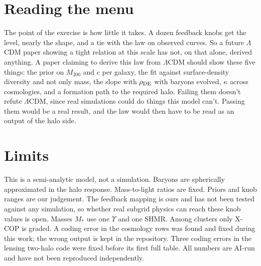 \documentclass[11pt]{article}
\begin{document}
\section{Reading the menu}
The point of the exercise is how little it takes. A dozen feedback knobs get the level, nearly the shape, and a tie with the law on observed curves. So a future $\Lambda$CDM paper showing a tight relation at this scale has not, on that alone, derived anything. A paper claiming to derive this law from $\Lambda$CDM should show these five things: the prior on $M_{200}$ and $c$ per galaxy, the fit against surface-density diversity and not only mass, the slope with $\rho_{\rm DE}$ with baryons evolved, $\kappa$ across cosmologies, and a formation path to the required halo. Failing them doesn't refute $\Lambda$CDM, since real simulations could do things this model can't. Passing them would be a real result, and the law would then have to be read as an output of the halo side.

\section{Limits}
This is a semi-analytic model, not a simulation. Baryons are spherically approximated in the halo response. Mass-to-light ratios are fixed. Priors and knob ranges are our judgement. The feedback mapping is ours and has not been tested against any simulation, so whether real subgrid physics can reach these knob values is open. Masses $M_*$ use one $\Upsilon$ and one SHMR. Among clusters only X-COP is graded. A coding error in the cosmology rows was found and fixed during this work; the wrong output is kept in the repository. Three coding errors in the lensing two-halo code were fixed before its first full table. All numbers are AI-run and have not been reproduced independently.
\end{document}
